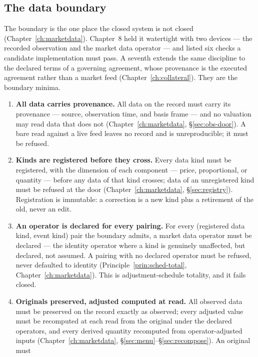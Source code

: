 \documentclass[11pt,a4paper]{article}
\begin{document}
\subsection{The data boundary}

The boundary is the one place the closed system is not closed
(Chapter~\ref{ch:marketdata}). Chapter~8 held it watertight with two devices --- the
recorded observation and the market data operator --- and listed six checks a candidate
implementation must pass. A seventh extends the same discipline to the declared terms of a
governing agreement, whose provenance is the executed agreement rather than a market feed
(Chapter~\ref{ch:collateral}). They are the boundary minima.

\begin{enumerate}[label=\textbf{B\arabic*.}, ref=B\arabic*, leftmargin=*, itemsep=3pt]
\item \textbf{All data carries provenance.} All data on the record must carry its
  provenance --- source, observation time, and basis frame --- and no valuation may read
  data that does not (Chapter~\ref{ch:marketdata}, \S\ref{sec:obs-door}). A bare read
  against a live feed leaves no record and is unreproducible; it must be refused.
\item \textbf{Kinds are registered before they cross.} Every data kind must be
  registered, with the dimension of each component --- price, proportional, or quantity ---
  before any data of that kind crosses; data of an unregistered kind must be refused at
  the door (Chapter~\ref{ch:marketdata}, \S\ref{sec:registry}). Registration is immutable:
  a correction is a new kind plus a retirement of the old, never an edit.
\item \textbf{An operator is declared for every pairing.} For every (registered data kind,
  event kind) pair the boundary admits, a market data operator must be declared --- the
  identity operator where a kind is genuinely unaffected, but declared, not assumed. A
  pairing with no declared operator must be refused, never defaulted to identity
  (Principle~\ref{prin:sched-total}, Chapter~\ref{ch:marketdata}). This is
  adjustment-schedule totality, and it fails closed.
\item \textbf{Originals preserved, adjusted computed at read.} All observed data must be
  preserved on the record exactly as observed; every adjusted value must be recomputed at
  each read from the original under the declared operators, and every derived quantity
  recomputed from operator-adjusted inputs
  (Chapter~\ref{ch:marketdata}, \S\ref{sec:menu}--\S\ref{sec:recompose}). An original must

\end{enumerate}
\end{document}
